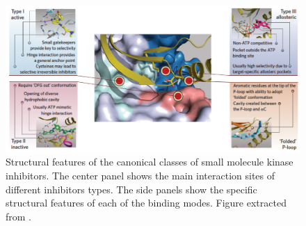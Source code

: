\documentclass[12pt, b5paper,twoside]{tesi_upf}
\begin{document}
 
 
 
 
\begin{figure}[htbp]
	\includegraphics[width=1\linewidth]{../figures/type_kinases_inhibitors.pdf}
	\caption[Structural features of the canonical classes of small molecule kinase inhibitors]{Structural features of the canonical classes of small molecule kinase inhibitors. The center panel shows the main interaction sites of different inhibitors types. The side panels show the specific structural features of each of the binding modes. Figure extracted from \cite{Muller2015}.}
	\label{fig:type_inhibitors}
	\vspace*{4mm}
\end{figure}
   
\end{document}
